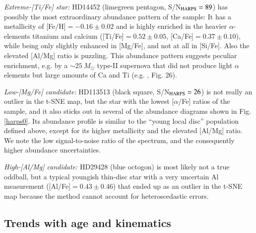\documentclass{aa}  %
\begin{document}
{\it Extreme-[Ti/Fe] star:} HD14452 (limegreen pentagon, S/N$_{\rm HARPS}=89$) has possibly the most extraordinary abundance pattern of the \citet{DelgadoMena2017} sample: It has a metallicity of [Fe/H]$=-0.16\pm0.02$ and is highly enriched in the heavier $\alpha$-elements titanium and calcium ([Ti/Fe]$=0.52\pm0.05$, [Ca/Fe]$=0.37\pm0.10$), while being only slightly enhanced in [Mg/Fe], and not at all in [Si/Fe]. Also the elevated [Al/Mg] ratio is puzzling. This abundance pattern suggests peculiar enrichment, e.g. by a $\sim25\ M_{\odot}$ type-II supernova that did not produce light $\alpha$ elements but large amounts of Ca and Ti (e.g. \citealt{Ritter2017a}, Fig. 26).

{\it Low-[Mg/Fe] candidate:} HD113513 (black square, S/N$_{\rm HARPS}=26$) is not really an outlier in the t-SNE map, but the star with the lowest [$\alpha$/Fe] ratios of the sample, and it also sticks out in several of the abundance diagrams shown in Fig. \ref{harps0}. Its abundance profile is similar to the ``young local disc'' population defined above, except for its higher metallicity and the elevated [Al/Mg] ratio. We note the low signal-to-noise ratio of the spectrum, and the consequently higher abundance uncertainties.%

{\it High-[Al/Mg] candidate:} HD29428 (blue octogon) is most likely not a true oddball, but a typical youngish thin-disc star with a very uncertain Al measurement ([Al/Fe]$=0.43\pm0.46$) that ended up as an outlier in the t-SNE map because the method cannot account for heteroscedastic errors.

\subsection{Trends with age and kinematics}
\end{document}
